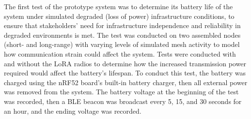 \documentclass[english,12pt,a4paper,titlepage]{article}
\begin{document}
	The first test of the prototype system was to determine its battery life of the system under simulated degraded (loss of power) infrastructure conditions, to ensure that stakeholders' need for infrastructure independence and reliability in degraded environments is met. The test was conducted on two assembled nodes (short- and long-range) with varying levels of simulated mesh activity to model how communication strain could affect the system. Tests were conducted with and without the LoRA radios to determine how the increased transmission power required would affect the battery's lifespan. To conduct this test, the battery was charged using the nRF52 board's built-in battery charger, then all external power was removed from the system. The battery voltage at the beginning of the test was recorded, then a BLE beacon was broadcast every 5, 15, and 30 seconds for an hour, and the ending voltage was recorded.
\end{document}
